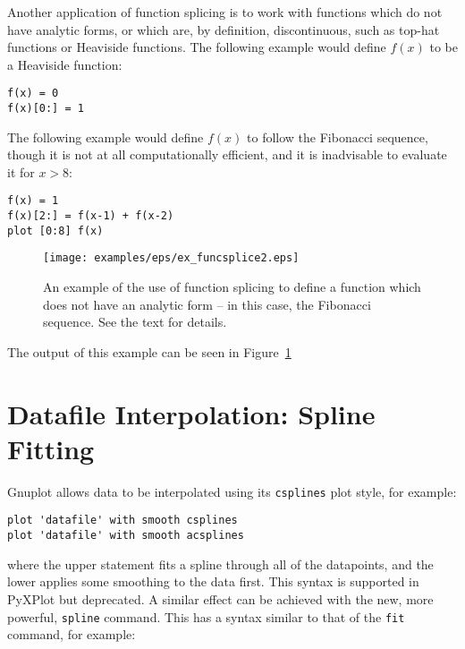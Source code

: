 \documentclass[a4paper,onecolumn,11pt]{book}
\begin{document}
Another application of function splicing is to work with functions which do not
have analytic forms, or which are, by definition, discontinuous, such as
top-hat functions or Heaviside functions. The following example would define
$f(x)$ to be a Heaviside function:

\begin{verbatim}
f(x) = 0
f(x)[0:] = 1
\end{verbatim}

\noindent The following example would define $f(x)$ to follow the Fibonacci
sequence, though it is not at all computationally efficient, and it is
inadvisable to evaluate it for $x>8$:

\begin{verbatim}
f(x) = 1
f(x)[2:] = f(x-1) + f(x-2)
plot [0:8] f(x)
\end{verbatim}

\begin{figure}
\begin{center}
\texttt{[image: examples/eps/ex\_funcsplice2.eps]}
\end{center}
\caption{An example of the use of function splicing to define a function which does not have an analytic form -- in this case, the Fibonacci sequence. See the text for details.}
\label{fig:ex_funcsplice2}
\end{figure}

\noindent The output of this example can be seen in Figure~\ref{fig:ex_funcsplice2}

\section{Datafile Interpolation: Spline Fitting}
\label{spline_command}

Gnuplot allows data to be interpolated using its \texttt{csplines} plot style,
for example:

\begin{verbatim}
plot 'datafile' with smooth csplines
plot 'datafile' with smooth acsplines
\end{verbatim}

\noindent where the upper statement fits a spline through all of the
datapoints, and the lower applies some smoothing to the data first. This syntax
is supported in PyXPlot but deprecated.  A similar effect can be achieved with
the new, more powerful, \texttt{spline} command. This has a syntax similar to that of the
\texttt{fit} command, for example:
\end{document}
